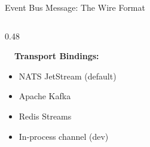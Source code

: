 \begin{frame}[fragile]{Event Bus Message: The Wire Format}
\begin{columns}[T]
\begin{column}{0.48\textwidth}
      \vspace{0.1cm}

      \fontsize{5}{6}\selectfont
      \textbf{\ \ Transport Bindings:}
      \begin{itemize}
        \setlength{\itemsep}{0pt}
        \item NATS JetStream (default)
        \item Apache Kafka
        \item Redis Streams
        \item In-process channel (dev)
      \end{itemize}
    \end{column}
  \end{columns}
\end{frame}

